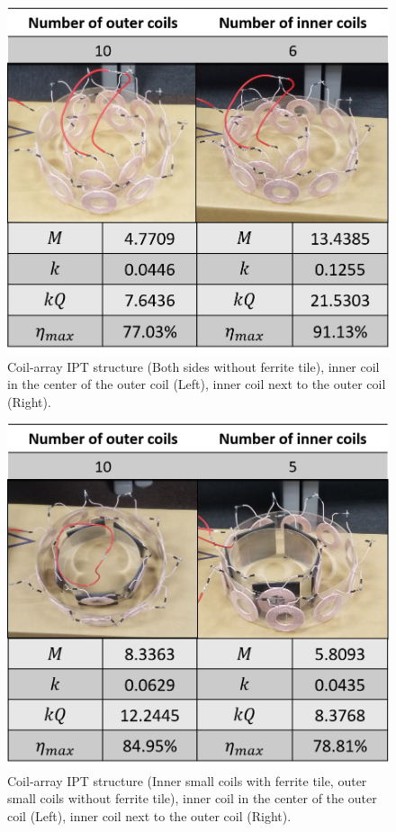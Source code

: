 \begin{figure}[!t]
    \centering
    \includegraphics[width=0.6\linewidth]{images/4_coil_6_10_without_ferrite.png}
    \caption{Coil-array IPT structure (Both sides without ferrite tile), inner coil in the center of the outer coil (Left), inner coil next to the outer coil (Right).}
\end{figure}
\begin{figure}[!t]
    \centering
    \includegraphics[width=0.6\linewidth]{images/4_coil_6_10_inner_with_ferrite.png}
    \caption{Coil-array IPT structure (Inner small coils with ferrite tile, outer small coils without ferrite tile), inner coil in the center of the outer coil (Left), inner coil next to the outer coil (Right).}
\end{figure}


